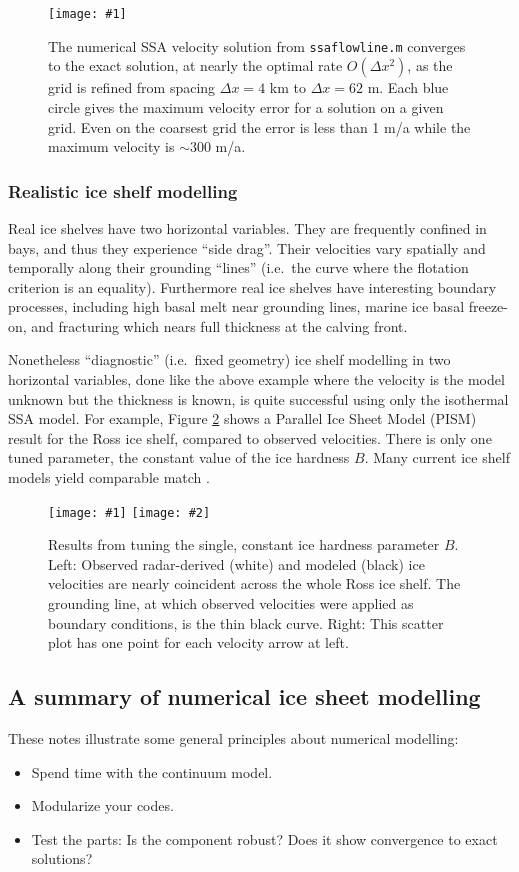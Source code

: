 \documentclass[letterpaper,final,12pt,reqno]{amsart}
\newcommand{\onefigsize}[3]{
\begin{figure}[ht]
\centering
\texttt{[image: \#1]}
\caption{#2}
\label{fig:#1}
\end{figure}}
\newcommand{\onefig}[2]{\onefigsize{#1}{#2}{3.0in}}
\newcommand{\twofigsizes}[5]{
\begin{figure}[ht]
\centering
\texttt{[image: \#1]} \quad
\texttt{[image: \#2]}
\caption{#3}
\label{fig:#1}
\end{figure}}
\begin{document}
\onefig{shelfconv}{The numerical SSA velocity solution from \texttt{ssaflowline.m} converges to the exact solution, at nearly the optimal rate $O(\Delta x^2)$, as the grid is refined from spacing $\Delta x=4$ km to $\Delta x=62$ m.  Each blue circle gives the maximum velocity error for a solution on a given grid.  Even on the coarsest grid the error is less than 1 m/a while the maximum velocity is $\sim 300$ m/a.}

\subsubsection*{Realistic ice shelf modelling}  Real ice shelves have two horizontal variables.  They are frequently confined in bays, and thus they experience ``side drag''.  Their velocities vary spatially and temporally along their grounding ``lines'' (i.e.~the curve where the flotation criterion is an equality).  Furthermore real ice shelves have interesting boundary processes, including high basal melt near grounding lines, marine ice basal freeze-on, and fracturing which nears full thickness at the calving front.

Nonetheless ``diagnostic'' (i.e.~fixed geometry) ice shelf modelling in two horizontal variables, done like the above example where the velocity is the model unknown but the thickness is known, is quite successful using only the isothermal SSA model.  For example, Figure \ref{fig:rossquiver} shows a Parallel Ice Sheet Model (PISM) result for the Ross ice shelf, compared to observed velocities.  There is only one tuned parameter, the constant value of the ice hardness $B$.  Many current ice shelf models yield comparable match \cite{MacAyealetal}.

\twofigsizes{rossquiver}{rossscatter}{Results from tuning the single, constant ice hardness parameter $B$.  Left: Observed radar-derived (white) and modeled (black) ice velocities are nearly coincident across the whole Ross ice shelf.  The grounding line, at which observed velocities were applied as boundary conditions, is the thin black curve.  Right: This scatter plot has one point for each velocity arrow at left.}{3.1in}{2.7in}


\subsection{A summary of numerical ice sheet modelling}

These notes illustrate some general principles about numerical modelling:
\begin{itemize}
\item Spend time with the continuum model.
\item Modularize your codes.
\item Test the parts: Is the component robust? Does it show convergence to exact solutions?
\end{itemize}
\end{document}
